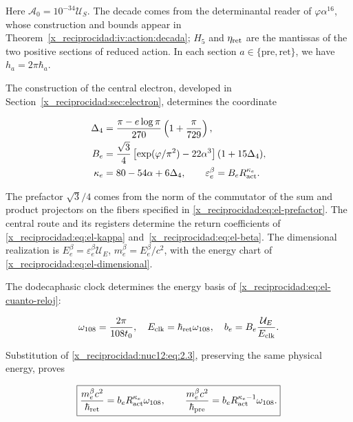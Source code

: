 Here \(\mathcal A_0=10^{-34}\mathcal U_S\). The decade comes from the determinantal reader of \(\varphi\alpha^{16}\), whose construction and bounds appear in Theorem~\ref{x_reciprocidad:iv:action:decada}; \(H_5\) and \(\eta_{\rm ret}\) are the mantissas of the two positive sections of reduced action. In each section \(a\in\{\mathrm{pre},\mathrm{ret}\}\), we have \(h_a=2\pi\hbar_a\).

The construction of the central electron, developed in Section~\ref{x_reciprocidad:sec:electron}, determines the coordinate



\begin{equation}
\begin{aligned}
\Delta_4&=\frac{\pi-e\log\pi}{270}\left(1+\frac{\pi}{729}\right),\\
B_e&=\frac{\sqrt3}{4}
\left[\exp(\varphi/\pi^2)-22\alpha^3\right](1+15\Delta_4),\\
\kappa_e&=80-54\alpha+6\Delta_4,\qquad
\varepsilon_e^\beta=B_eR_{\rm act}^{\kappa_e}.
\end{aligned}
\label{x_reciprocidad:nuc12:eq:2.3}
\end{equation}



The prefactor \(\sqrt3/4\) comes from the norm of the commutator of the sum and product projectors on the fibers specified in \eqref{x_reciprocidad:eq:el-prefactor}. The central route and its registers determine the return coefficients of \eqref{x_reciprocidad:eq:el-kappa} and~\eqref{x_reciprocidad:eq:el-beta}. The dimensional realization is \(E_e^\beta=\varepsilon_e^\beta\mathcal U_E\), \(m_e^\beta=E_e^\beta/c^2\), with the energy chart of \eqref{x_reciprocidad:eq:el-dimensional}.

The dodecaphasic clock determines the energy basis of \eqref{x_reciprocidad:eq:el-cuanto-reloj}:



\[
\omega_{108}=\frac{2\pi}{108t_0},\quad
E_{\rm clk}=\hbar_{\rm ret}\omega_{108},\quad
b_e=B_e\frac{\mathcal U_E}{E_{\rm clk}}.
\]



Substitution of \eqref{x_reciprocidad:nuc12:eq:2.3}, preserving the same physical energy, proves



\begin{equation}
\boxed{\frac{m_e^\beta c^2}{\hbar_{\rm ret}}
=b_eR_{\rm act}^{\kappa_e}\omega_{108},\qquad
\frac{m_e^\beta c^2}{\hbar_{\rm pre}}
=b_eR_{\rm act}^{\kappa_e-1}\omega_{108}.}
\label{x_reciprocidad:nuc12:eq:2.4}
\end{equation}




